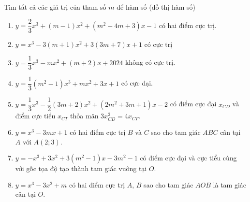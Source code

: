 \begin{bt}%
	 Tìm tất cả các giá trị của tham số $m$ để hàm số (đồ thị hàm số)
	\begin{enumerate}
		\item $y = \dfrac{2}{3}x^3 + (m -  1)x^2 + (m^2 - 4m + 3)x - 1$ có hai điểm cực trị.
		\item $y = x^3 - 3(m + 1)x^2 + 3(3m + 7)x +  1$ có cực trị
		\item $y = \dfrac{1}{3}x^3 - mx^2 + (m + 2)x + 2024$ không có  cực trị.
		\item $y = \dfrac{1}{3}(m^2 - 1)x^3 + mx^2 + 3x + 1$  có cực đại.
		\item $y = \dfrac{1}{3}x^3 - \dfrac{1}{2}(3m + 2)x^2 + (2m^2 + 3m + 1)x - 2$ có điểm cực đại $x_{CD}$ và điểm  cực tiểu $x_{CT}$ thỏa mãn $3x_{CD}^2 = 4x_{CT}$.
		\item $y = x^3 - 3mx + 1$ có hai điểm cực trị $B$ và $C$  sao cho tam giác $ABC$ cân tại $A$ với $A(2;3)$.
		\item $y = -x^3 + 3x^2 + 3(m^2 - 1)x - 3m^2 - 1$ có điểm cực đại và cực tiểu cùng với gốc tọa độ tạo thành tam  giác vuông tại $O$.
		\item $y = x^3 - 3x^2 + m$ có hai điểm cực trị  $A$, $B$ sao cho tam giác $AOB$ là tam giác cân tại $O$.
	\end{enumerate}
\end{bt}
